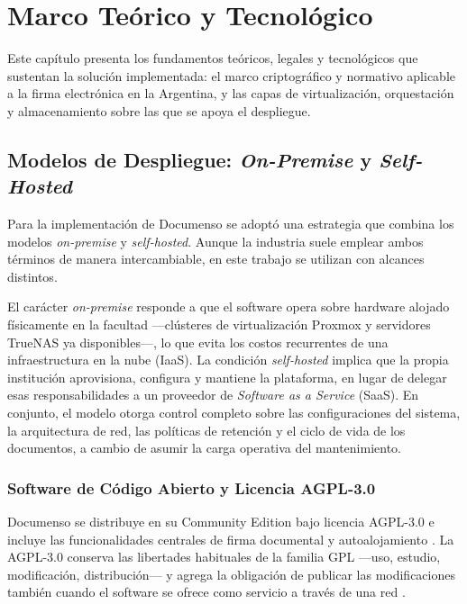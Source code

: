 \chapter{Marco Teórico y Tecnológico}
\label{chap:marco_teorico}

Este capítulo presenta los fundamentos teóricos, legales y tecnológicos que sustentan la solución implementada: el marco criptográfico y normativo aplicable a la firma electrónica en la Argentina, y las capas de virtualización, orquestación y almacenamiento sobre las que se apoya el despliegue.

\section{Modelos de Despliegue: \textit{On-Premise} y \textit{Self-Hosted}}
\label{sec:onpremise_selfhosted}

Para la implementación de Documenso se adoptó una estrategia que combina los modelos \textit{on-premise} y \textit{self-hosted}. Aunque la industria suele emplear ambos términos de manera intercambiable, en este trabajo se utilizan con alcances distintos.

El carácter \textit{on-premise} responde a que el software opera sobre hardware alojado físicamente en la facultad ---clústeres de virtualización Proxmox y servidores TrueNAS ya disponibles---, lo que evita los costos recurrentes de una infraestructura en la nube (IaaS). La condición \textit{self-hosted} implica que la propia institución aprovisiona, configura y mantiene la plataforma, en lugar de delegar esas responsabilidades a un proveedor de \textit{Software as a Service} (SaaS). En conjunto, el modelo otorga control completo sobre las configuraciones del sistema, la arquitectura de red, las políticas de retención y el ciclo de vida de los documentos, a cambio de asumir la carga operativa del mantenimiento.

\subsection{Software de Código Abierto y Licencia AGPL-3.0}

Documenso se distribuye en su Community Edition bajo licencia AGPL-3.0 e incluye las funcionalidades centrales de firma documental y autoalojamiento \cite{documenso_community,documenso_github}. La AGPL-3.0 conserva las libertades habituales de la familia GPL ---uso, estudio, modificación, distribución--- y agrega la obligación de publicar las modificaciones también cuando el software se ofrece como servicio a través de una red \cite{documenso_community,agpl_fossa,agpl_ultralytics}.

